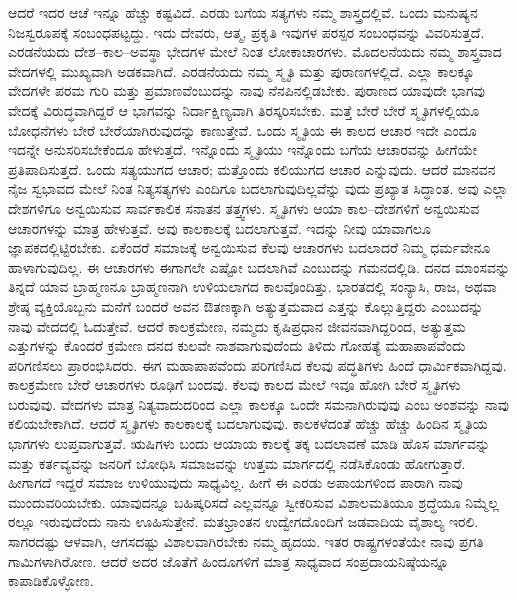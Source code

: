 ಆದರೆ ಇದರ ಆಚೆ ಇನ್ನೂ ಹೆಚ್ಚು ಕಷ್ಟವಿದೆ. ಎರಡು ಬಗೆಯ ಸತ್ಯಗಳು ನಮ್ಮ ಶಾಸ್ತ್ರದಲ್ಲಿವೆ. ಒಂದು ಮನುಷ್ಯನ ನಿಜಸ್ವರೂಪಕ್ಕೆ ಸಂಬಂಧಪಟ್ಟದ್ದು. ಇದು ದೇವರು, ಆತ್ಮ, ಪ್ರಕೃತಿ ಇವುಗಳ ಪರಸ್ಪರ ಸಂಬಂಧವನ್ನು ವಿವರಿಸುತ್ತದೆ. ಎರಡನೆಯದು ದೇಶ–ಕಾಲ–ಅವಸ್ಥಾ ಭೇದಗಳ ಮೇಲೆ ನಿಂತ ಲೋಕಾಚಾರಗಳು. ಮೊದಲನೆಯದು ನಮ್ಮ ಶಾಸ್ತ್ರವಾದ ವೇದಗಳಲ್ಲಿ ಮುಖ್ಯವಾಗಿ ಅಡಕವಾಗಿದೆ. ಎರಡನೆಯದು ನಮ್ಮ ಸ್ಮೃತಿ ಮತ್ತು ಪುರಾಣಗಳಲ್ಲಿದೆ. ಎಲ್ಲಾ ಕಾಲಕ್ಕೂ ವೇದಗಳೇ ಪರಮ ಗುರಿ ಮತ್ತು ಪ್ರಮಾಣವೆಂಬುದನ್ನು ನಾವು ನೆನಪಿನಲ್ಲಿಡಬೇಕು. ಪುರಾಣದ ಯಾವುದೇ ಭಾಗವು ವೇದಕ್ಕೆ ವಿರುದ್ಧವಾಗಿದ್ದರೆ ಆ ಭಾಗವನ್ನು ನಿರ್ದಾಕ್ಷಿಣ್ಯವಾಗಿ ತಿರಸ್ಕರಿಸಬೇಕು. ಮತ್ತೆ ಬೇರೆ ಬೇರೆ ಸ್ಮೃತಿಗಳಲ್ಲಿಯೂ ಬೋಧನೆಗಳು ಬೇರೆ ಬೇರೆಯಾಗಿರುವುದನ್ನು ಕಾಣುತ್ತೇವೆ. ಒಂದು ಸ್ಮೃತಿಯ ಈ ಕಾಲದ ಆಚಾರ ಇದೇ ಎಂದೂ ಇದನ್ನೇ ಅನುಸರಿಸಬೇಕೆಂದೂ ಹೇಳುತ್ತದೆ. ಇನ್ನೊಂದು ಸ್ಮೃತಿಯು ಇನ್ನೊಂದು ಬಗೆಯ ಆಚಾರವನ್ನು ಹೀಗೆಯೇ ಪ್ರತಿಪಾದಿಸುತ್ತದೆ. ಒಂದು ಸತ್ಯಯುಗದ ಆಚಾರ; ಮತ್ತೊಂದು ಕಲಿಯುಗದ ಆಚಾರ ಎನ್ನುವುದು. ಆದರೆ ಮಾನವನ ನೈಜ ಸ್ವಭಾವದ ಮೇಲೆ ನಿಂತ ನಿತ್ಯಸತ್ಯಗಳು ಎಂದಿಗೂ ಬದಲಾಗುವುದಿಲ್ಲವೆನ್ನು ವುದು ಪ್ರಖ್ಯಾತ ಸಿದ್ಧಾಂತ. ಅವು ಎಲ್ಲಾ ದೇಶಗಳಿಗೂ ಅನ್ವಯಿಸುವ ಸಾರ್ವಕಾಲಿಕ ಸನಾತನ ತತ್ತ್ವಗಳು. ಸ್ಮೃತಿಗಳು ಆಯಾ ಕಾಲ–ದೇಶಗಳಿಗೆ ಅನ್ವಯಿಸುವ ಆಚಾರಗಳನ್ನು ಮಾತ್ರ ಹೇಳುತ್ತವೆ. ಅವು ಕಾಲಕಾಲಕ್ಕೆ ಬದಲಾಗುತ್ತವೆ. ಇದನ್ನು ನೀವು ಯಾವಾಗಲೂ ಜ್ಞಾಪಕದಲ್ಲಿಟ್ಟಿರಬೇಕು. ಏಕೆಂದರೆ ಸಮಾಜಕ್ಕೆ ಅನ್ವಯಿಸುವ ಕೆಲವು ಆಚಾರಗಳು ಬದಲಾದರೆ ನಿಮ್ಮ ಧರ್ಮವೇನೂ ಹಾಳಾಗುವುದಿಲ್ಲ. ಈ ಆಚಾರಗಳು ಈಗಾಗಲೇ ಎಷ್ಟೋ ಬದಲಾಗಿವೆ ಎಂಬುದನ್ನು ಗಮನದಲ್ಲಿಡಿ. ದನದ ಮಾಂಸವನ್ನು ತಿನ್ನದೆ ಯಾವ ಬ್ರಾಹ್ಮಣನೂ ಬ್ರಾಹ್ಮಣನಾಗಿ ಉಳಿಯಲಾಗದ ಕಾಲವೊಂದಿತ್ತು. ಭಾರತದಲ್ಲಿ ಸಂನ್ಯಾಸಿ, ರಾಜ, ಅಥವಾ ಶ್ರೇಷ್ಠ ವ್ಯಕ್ತಿಯೊಬ್ಬನು ಮನೆಗೆ ಬಂದರೆ ಅವನ ಔತಣಕ್ಕಾಗಿ ಅತ್ಯುತ್ತಮವಾದ ಎತ್ತನ್ನು ಕೊಲ್ಲುತ್ತಿದ್ದರು ಎಂಬುದನ್ನು ನಾವು ವೇದದಲ್ಲಿ ಓದುತ್ತೇವೆ. ಆದರೆ ಕಾಲಕ್ರಮೇಣ, ನಮ್ಮದು ಕೃಷಿಪ್ರಧಾನ ಜೀವನವಾಗಿದ್ದರಿಂದ, ಅತ್ಯುತ್ತಮ ಎತ್ತುಗಳನ್ನು ಕೊಂದರೆ ಕ್ರಮೇಣ ದನದ ಕುಲವೇ ನಾಶವಾಗುವುದೆಂದು ತಿಳಿದು ಗೋಹತ್ಯೆ ಮಹಾಪಾಪವೆಂದು ಪರಿಗಣಿಸಲು ಪ್ರಾರಂಭಿಸಿದರು. ಈಗ ಮಹಾಪಾಪವೆಂದು ಪರಿಗಣಿಸಿದ ಕೆಲವು ಪದ್ಧತಿಗಳು ಹಿಂದೆ ಧಾರ್ಮಿಕವಾಗಿದ್ದವು. ಕಾಲಕ್ರಮೇಣ ಬೇರೆ ಆಚಾರಗಳು ರೂಢಿಗೆ ಬಂದವು. ಕೆಲವು ಕಾಲದ ಮೇಲೆ ಇವೂ ಹೋಗಿ ಬೇರೆ ಸ್ಮೃತಿಗಳು ಬರುವುವು. ವೇದಗಳು ಮಾತ್ರ ನಿತ್ಯವಾದುದರಿಂದ ಎಲ್ಲಾ ಕಾಲಕ್ಕೂ ಒಂದೇ ಸಮನಾಗಿರುವುವು ಎಂಬ ಅಂಶವನ್ನು ನಾವು ಕಲಿಯಬೇಕಾಗಿದೆ. ಆದರೆ ಸ್ಮೃತಿಗಳು ಕಾಲಕಾಲಕ್ಕೆ ಬದಲಾಗುವುವು. ಕಾಲಕಳೆದಂತೆ ಹೆಚ್ಚು ಹೆಚ್ಚು ಹಿಂದಿನ ಸ್ಮೃತಿಯ ಭಾಗಗಳು ಲುಪ್ತವಾಗುತ್ತವೆ. ಋಷಿಗಳು ಬಂದು ಆಯಾಯ ಕಾಲಕ್ಕೆ ತಕ್ಕ ಬದಲಾವಣೆ ಮಾಡಿ ಹೊಸ ಮಾರ್ಗವನ್ನು ಮತ್ತು ಕರ್ತವ್ಯವನ್ನು ಜನರಿಗೆ ಬೋಧಿಸಿ ಸಮಾಜವನ್ನು ಉತ್ತಮ ಮಾರ್ಗದಲ್ಲಿ ನಡೆಸಿಕೊಂಡು ಹೋಗುತ್ತಾರೆ. ಹೀಗಾಗದೆ ಇದ್ದರೆ ಸಮಾಜ ಉಳಿಯುವುದು ಸಾಧ್ಯವಿಲ್ಲ. ಹೀಗೆ ಈ ಎರಡು ಅಪಾಯಗಳಿಂದ ಪಾರಾಗಿ ನಾವು ಮುಂದುವರಿಯಬೇಕು. ಯಾವುದನ್ನೂ ಬಹಿಷ್ಕರಿಸದೆ ಎಲ್ಲವನ್ನೂ ಸ್ವೀಕರಿಸುವ ವಿಶಾಲಮತಿಯೂ ಶ್ರದ್ಧೆಯೂ ನಿಮ್ಮೆಲ್ಲ ರಲ್ಲೂ ಇರುವುದೆಂದು ನಾನು ಊಹಿಸುತ್ತೇನೆ. ಮತಭ್ರಾಂತನ ಉದ್ವೇಗದೊಂದಿಗೆ ಜಡವಾದಿಯ ವೈಶಾಲ್ಯ ಇರಲಿ. ಸಾಗರದಷ್ಟು ಆಳವಾಗಿ, ಆಗಸದಷ್ಟು ವಿಶಾಲವಾಗಿರಬೇಕು ನಮ್ಮ ಹೃದಯ. ಇತರ ರಾಷ್ಟ್ರಗಳಂತೆಯೇ ನಾವು ಪ್ರಗತಿ ಗಾಮಿಗಳಾಗಿರೋಣ. ಆದರೆ ಅದರ ಜೊತೆಗೆ ಹಿಂದೂಗಳಿಗೆ ಮಾತ್ರ ಸಾಧ್ಯವಾದ ಸಂಪ್ರದಾಯನಿಷ್ಠೆಯನ್ನೂ ಕಾಪಾಡಿಕೊಳ್ಳೋಣ. 


